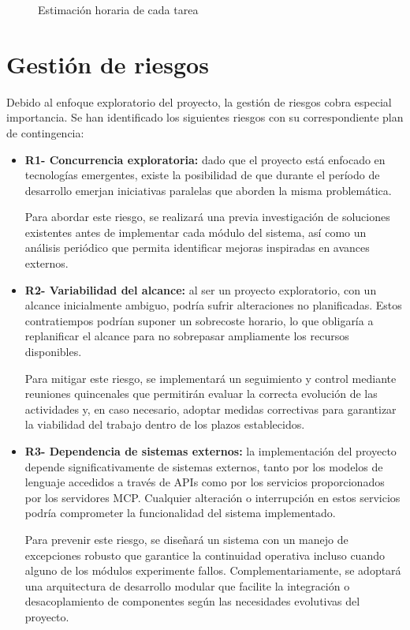 \begin{figure}[h]
  \centering
  \caption{Estimación horaria de cada tarea}
  \label{fig:horas}
\end{figure}

\section{Gestión de riesgos}

Debido al enfoque exploratorio del proyecto, la gestión de riesgos cobra especial importancia. Se han identificado los siguientes riesgos con su correspondiente plan de contingencia: 

\begin{itemize}
  \item\textbf{R1- Concurrencia exploratoria: }dado que el proyecto está enfocado en tecnologías emergentes, existe la posibilidad de que durante el período de desarrollo emerjan iniciativas paralelas que aborden la misma problemática.  

Para abordar este riesgo, se realizará una previa investigación de soluciones existentes antes de implementar cada módulo del sistema, así como un análisis periódico que permita identificar mejoras inspiradas en avances externos.

\item\textbf{R2- Variabilidad del alcance: }al ser un proyecto exploratorio, con un alcance inicialmente ambiguo, podría sufrir alteraciones no planificadas. Estos contratiempos podrían suponer un sobrecoste horario, lo que obligaría a replanificar el alcance para no sobrepasar ampliamente los recursos disponibles.

Para mitigar este riesgo, se implementará un seguimiento y control mediante reuniones quincenales que permitirán evaluar la correcta evolución de las actividades y, en caso necesario, adoptar medidas correctivas para garantizar la viabilidad del trabajo dentro de los plazos establecidos.


\item\textbf{R3- Dependencia de sistemas externos: }la implementación del proyecto depende significativamente de sistemas externos, tanto por los modelos de lenguaje accedidos a través de APIs como por los servicios proporcionados por los servidores MCP. Cualquier alteración o interrupción en estos servicios podría comprometer la funcionalidad del sistema implementado.

Para prevenir este riesgo, se diseñará un sistema con un manejo de excepciones robusto que garantice la continuidad operativa incluso cuando alguno de los módulos experimente fallos. Complementariamente, se adoptará una arquitectura de desarrollo modular que facilite la integración o desacoplamiento de componentes según las necesidades evolutivas del proyecto.


\end{itemize}
